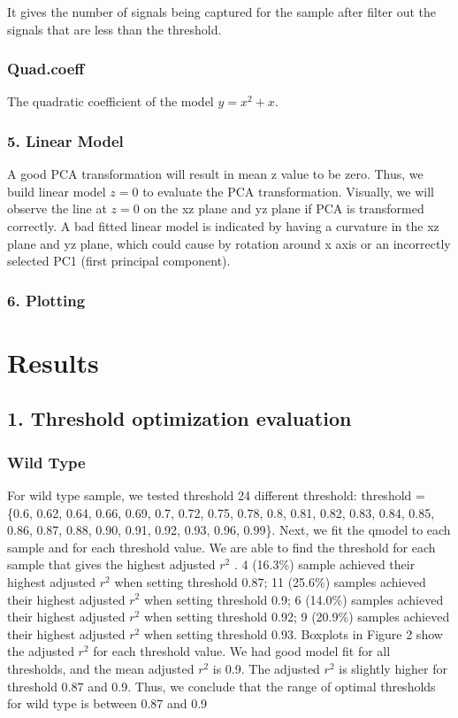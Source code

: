 \documentclass[10pt,letterpaper]{article}
\begin{document}
It gives the number of signals being captured for the sample after
filter out the signals that are less than the threshold.

\subsubsection{Quad.coeff}\label{quad.coeff}

The quadratic coefficient of the model \(y=x^2+x\).

\subsubsection{5. Linear Model}\label{linear-model}

A good PCA transformation will result in mean z value to be zero. Thus,
we build linear model \(z=0\) to evaluate the PCA transformation.
Visually, we will observe the line at \(z=0\) on the xz plane and yz
plane if PCA is transformed correctly. A bad fitted linear model is
indicated by having a curvature in the xz plane and yz plane, which
could cause by rotation around x axis or an incorrectly selected PC1
(first principal component).

\subsubsection{6. Plotting}\label{plotting}

\section{Results}\label{results}

\subsection{1. Threshold optimization
evaluation}\label{threshold-optimization-evaluation}

\subsubsection{Wild Type}\label{wild-type}

For wild type sample, we tested threshold 24 different threshold:
threshold = \{0.6, 0.62, 0.64, 0.66, 0.69, 0.7, 0.72, 0.75, 0.78, 0.8,
0.81, 0.82, 0.83, 0.84, 0.85, 0.86, 0.87, 0.88, 0.90, 0.91, 0.92, 0.93,
0.96, 0.99\}. Next, we fit the qmodel to each sample and for each
threshold value. We are able to find the threshold for each sample that
gives the highest adjusted \(r^2\) . 4 (16.3\%) sample achieved their
highest adjusted \(r^2\) when setting threshold 0.87; 11 (25.6\%)
samples achieved their highest adjusted \(r^2\) when setting threshold
0.9; 6 (14.0\%) samples achieved their highest adjusted \(r^2\) when
setting threshold 0.92; 9 (20.9\%) samples achieved their highest
adjusted \(r^2\) when setting threshold 0.93. Boxplots in Figure 2 show
the adjusted \(r^2\) for each threshold value. We had good model fit for
all thresholds, and the mean adjusted \(r^2\) is 0.9. The adjusted
\(r^2\) is slightly higher for threshold 0.87 and 0.9. Thus, we conclude
that the range of optimal thresholds for wild type is between 0.87 and
0.9
\end{document}
